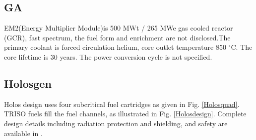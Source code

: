 \restoregeometry
\pagebreak

\subsection{GA}
EM2(Energy Multiplier Module)is 500 MWt / 265 MWe gas cooled reactor (GCR), fast spectrum, the fuel form and enrichment are not disclosed.The primary coolant is forced circulation helium, core outlet temperature 850 $^\circ{}$C. The core lifetime is 30 years. The power conversion cycle is not specified.

\subsection{Holosgen}
Holos design uses four subcritical fuel cartridges as given in Fig. \ref{Holosquad}. TRISO fuels fill the fuel channels, as illustrated in Fig. \ref{Holosdesign}. Complete design details including radiation protection and shielding, and safety are available in \cite{filippone_holos_2017}.

